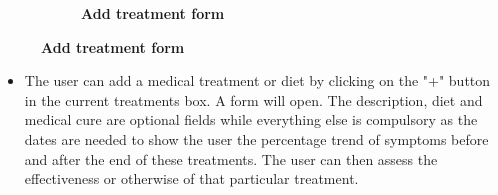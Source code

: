 \documentclass [12pt]{article}
\begin{document}
\begin{description}[leftmargin=1cm,rightmargin=1cm]
\begin{figure}[h!]
\begin{subfigure}[tr]{0.3\linewidth}
\caption{\textbf{Add treatment form}}
\end{subfigure}
\hspace*{\fill}
\end{figure}
\begin{itemize}[•]
\item The user can add a medical treatment or diet by clicking on the "+" button in the current treatments box. A form will open. The description, diet and medical cure are optional fields while everything else is compulsory as the dates are needed to show the user the percentage trend of symptoms before and after the end of these treatments. The user can then assess the effectiveness or otherwise of that particular treatment. 
\end{itemize}

\clearpage
\item [ 5)Visualize statistics]
\
\
\
\begin{figure}[h!]
\centering
\hspace*{\fill}
\begin{subfigure}[tl]{0.3\linewidth}

\end{subfigure}
\end{figure}
\end{description}
\end{document}
